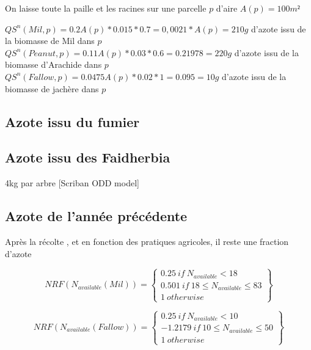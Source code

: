 \documentclass[10pt,a4paper,french]{article} %
\begin{document}
On laisse toute la paille et les racines sur une parcelle $p$ d'aire $A(p)=100m²$


$QS^{n}(Mil, p)= 0.2 A(p)* 0.015 * 0.7 = 0,0021* A(p)= 210g$ d'azote issu de la biomasse de Mil dans $p$ \\
$QS^{n}(Peanut, p)= 0.11 A(p) * 0.03 * 0.6 = 0.21978 = 220g$ d'azote issu de la biomasse d'Arachide  dans $p$\\
$QS^{n}(Fallow, p)= 0.0475 A(p)* 0.02 * 1 = 0.095 = 10g$ d'azote issu de la biomasse de jachère  dans $p$ \\



\subsection{Azote issu du fumier}






\subsection{Azote issu des Faidherbia}


4kg par arbre [Scriban ODD model]


\subsection{Azote de l'année précédente}



Après la récolte , et en fonction des pratiques agricoles, il reste une fraction d'azote 




\begin{equation}
  NRF(N_{available}(Mil))=\left\{
                \begin{array}{ll}
                  0.25 \ if \ N_{available} < 18\\
                0.501 \ if \ 18 \leq N_{available} \leq 83  \\
                  1 \ otherwise
                \end{array}
              \right\} 
 \end{equation} 

 \begin{equation}
   NRF(N_{available}(Fallow))=\left\{
                \begin{array}{ll}
                  0.25 \ if \ N_{available} < 10\\
                -1.2179 \ if \ 10 \leq N_{available} \leq 50  \\
                  1 \ otherwise
                \end{array}
              \right\}
  \end{equation} 
  
\end{document}

